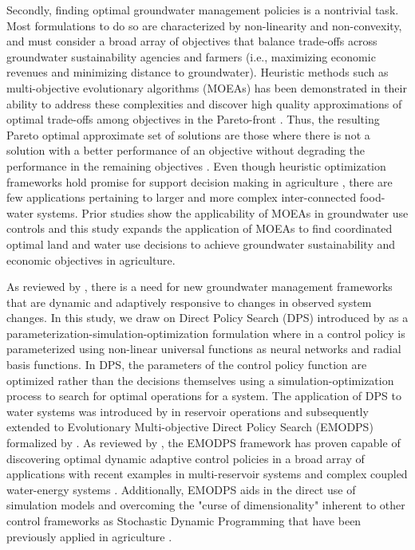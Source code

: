 \documentclass[a4paper,fleqn]{cas-sc}
\begin{document}
Secondly, finding optimal groundwater management policies is a nontrivial task. Most formulations to do so are characterized by non-linearity and non-convexity, and must consider a broad array of objectives that balance trade-offs across groundwater sustainability agencies and farmers (i.e., maximizing economic revenues and minimizing distance to groundwater). Heuristic methods such as  multi-objective evolutionary algorithms (MOEAs) has been demonstrated in their ability to address these complexities and discover high quality approximations of optimal trade-offs among objectives in the Pareto-front \citep{reed_evolutionary_2013}. Thus, the resulting Pareto optimal approximate set of solutions are those where there is not a solution with a better performance of an objective without degrading the performance in the remaining objectives \citep{coello_evolutionary_2007}. Even though heuristic optimization frameworks hold promise for support decision making in agriculture \citep{memmah_metaheuristics_2015}, there are few applications pertaining to larger and more complex inter-connected food-water systems. Prior studies show the applicability of MOEAs in groundwater use controls \citep{afshar_multi-objective_2020,salehi_shafa_multi-objective_2023,habibi_davijani_optimization_2016,mehrabi_assessment_2021,banihabib_development_2019,hesamfar_simulation-based_2023} and this study expands the application of MOEAs to find coordinated optimal land and water use decisions to achieve groundwater sustainability and economic objectives in agriculture.  

As reviewed by \citet{thomann_adaptive_2020}, there is a need for new groundwater management frameworks that are dynamic and adaptively responsive to changes in observed system changes. In this study, we draw on Direct Policy Search (DPS) introduced by \citet{rosenstein_robot_2001} as a parameterization-simulation-optimization formulation where in a control policy is parameterized using non-linear universal functions as neural networks and radial basis functions. In DPS, the parameters of the control policy function are optimized rather than the decisions themselves using a simulation-optimization process to search for optimal operations for a system. The application of DPS to water systems was introduced by \citet{koutsoyiannis_evaluation_2003} in reservoir operations and subsequently extended to Evolutionary Multi-objective Direct Policy Search (EMODPS) formalized by \citet{giuliani_coupled_2016}. As reviewed by \citet{giuliani_state---art_2021}, the EMODPS framework has proven capable of discovering optimal dynamic adaptive control policies in a broad array of applications with recent examples in multi-reservoir systems \citep{macian-sorribes_inferring_2019} and complex coupled water-energy systems \citep{gupta_can_2020,doering_diagnosing_2021,hamilton_stream_2022}. Additionally, EMODPS aids in the direct use of simulation models and overcoming the "curse of dimensionality" inherent to other control frameworks as Stochastic Dynamic Programming that have been previously applied in agriculture \citep{taylor_dynamic_1993}. 
\end{document}
